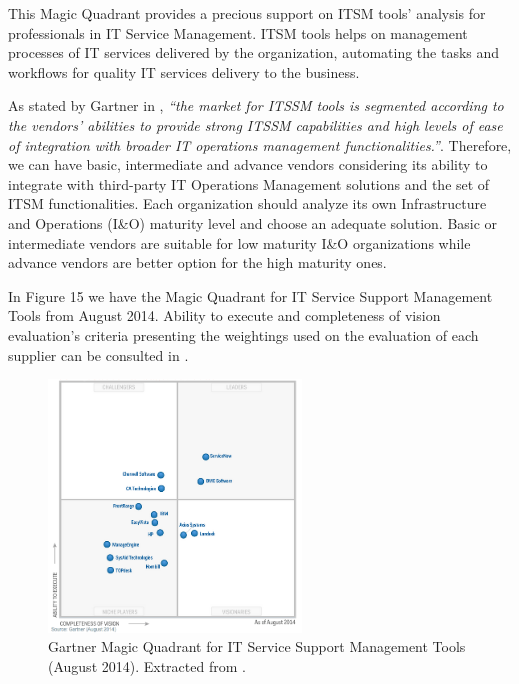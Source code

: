This Magic Quadrant provides a precious support on ITSM tools' analysis for professionals in IT Service Management. ITSM tools helps on management processes of IT services delivered by the organization, automating the tasks and workflows for quality IT services delivery to the business.\par
As stated by Gartner in \cite{magicQuadrantITSM}, \textit{``the market for ITSSM tools is segmented according to the vendors' abilities to provide strong ITSSM capabilities and high levels of ease of integration with broader IT operations management functionalities.''}. Therefore, we can have basic, intermediate and advance vendors considering its ability to integrate with third-party IT Operations Management solutions and the set of ITSM functionalities. Each organization should analyze its own Infrastructure and Operations (I\&O) maturity level and choose an adequate solution. Basic or intermediate vendors are suitable for low maturity I\&O organizations while advance vendors are better option for the high maturity ones.\par
In Figure 15 we have the Magic Quadrant for IT Service Support Management Tools from August 2014. Ability to execute and completeness of vision evaluation's criteria presenting the weightings used on the evaluation of each supplier can be consulted in \cite{magicQuadrantITSM}.\par

\begin{figure}[h!]
\centering
\includegraphics[width=0.6\textwidth]{img/GartnerITSMQuadrant.png}
\caption{Gartner Magic Quadrant for IT Service Support Management Tools (August 2014). Extracted from \cite{magicQuadrantITSM}.}
\end{figure}


